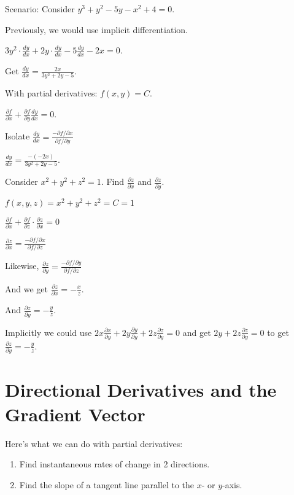 \documentclass[../calc3.tex]{subfiles}
\begin{document}
\pagebreak
\begin{example}
    Scenario: Consider $y^3+y^2-5y-x^2+4=0$.

    Previously, we would use implicit differentiation.

    $3y^2\cdot \frac{dy}{dx}+2y\cdot \frac{dy}{dx}-5\frac{dy}{dx}-2x=0$.

    Get $\frac{dy}{dx}=\frac{2x}{3y^2+2y-5}$.

    With partial derivatives: $f(x,y)=C$.

    $\frac{\partial f}{\partial x}+\frac{\partial f}{\partial y}\frac{dy}{dx}=0$.

    Isolate $\frac{dy}{dx}=\frac{-\partial f/\partial x}{\partial f/\partial y}$ 

    $\frac{dy}{dx}=\frac{-(-2x)}{3y^2+2y-5}$.
\end{example}

\begin{example}
    Consider $x^2+y^2+z^2=1$. Find $\frac{\partial z}{\partial x}$ and $\frac{\partial z}{\partial y}$.

    $f(x,y,z)=x^2+y^2+z^2 = C = 1$

    $\frac{\partial f}{\partial x}+\frac{\partial f}{\partial z}\cdot \frac{\partial z}{\partial x}=0$

    $\frac{\partial z}{\partial x}=\frac{-\partial f/\partial x}{\partial f/\partial z}$

    Likewise, $\frac{\partial z}{\partial y}=\frac{-\partial f/\partial y}{\partial f/\partial z}$

    And we get $\frac{\partial z}{\partial x}=-\frac{x}{z}$.

    And $\frac{\partial z}{\partial y}=-\frac{y}{z}$.

    Implicitly we could use $2x\frac{\partial x}{\partial y}+2y\frac{\partial y}{\partial y}+2z\frac{\partial z}{\partial y}=0$ and get $2y+2z\frac{\partial z}{\partial y}=0$ to get $\frac{\partial z}{\partial y}=-\frac{y}{z}$.
\end{example}


\section{Directional Derivatives and the Gradient Vector}
Here's what we can do with partial derivatives:
\begin{enumerate}
    \item Find instantaneous rates of change in 2 directions.
    \item Find the slope of a tangent line parallel to the $x$- or $y$-axis.
\end{enumerate}
\end{document}
